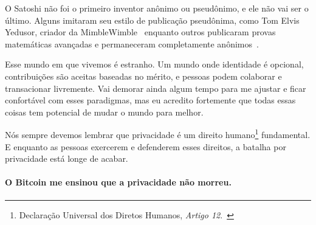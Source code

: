 O Satoshi não foi o primeiro inventor anônimo ou pseudônimo, e ele não vai ser o último.
Alguns imitaram seu estilo de publicação pseudônima, como Tom Elvis Yedusor, criador da 
MimbleWimble~\cite{mimblewimble-origin} enquanto outros publicaram provas matemáticas avançadas 
e permaneceram completamente anônimos~\cite{4chan-math}.

Esse mundo em que vivemos é estranho. Um mundo onde identidade é opcional, 
contribuições são aceitas baseadas no mérito, e pessoas podem colaborar e transacionar livremente.
Vai demorar ainda algum tempo para me ajustar e ficar confortável com esses paradigmas, mas eu acredito
fortemente que todas essas coisas tem potencial de mudar o mundo para melhor.

Nós sempre devemos lembrar que privacidade é um direito humano\footnote{Declaração Universal dos Diretos Humanos, \textit{Artigo 12}.~\cite{article12}} fundamental. 
E enquanto as pessoas exercerem e defenderem 
esses direitos, a batalha por privacidade está longe de acabar.

\paragraph{O Bitcoin me ensinou que a privacidade não morreu.}

%
%
%
%
